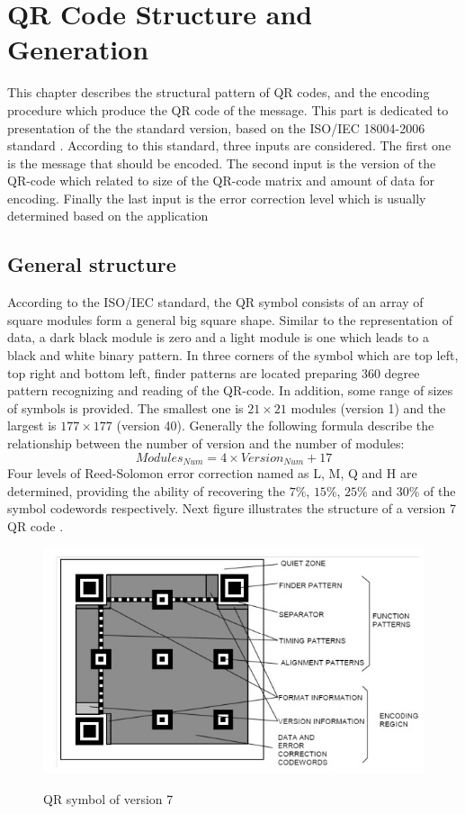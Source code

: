 \chapter{QR Code Structure and Generation}

This chapter describes the structural pattern of QR codes, and the encoding procedure which produce the QR code of the message. This part is dedicated to presentation of the the standard version, based on the ISO/IEC 18004-2006 standard \cite{1iso}. According to this standard, three inputs are considered. The first one is the message that should be encoded. The second input is the version of the QR-code which related to size of the QR-code matrix and amount of data for encoding. Finally the last input is the error correction level which is usually determined based on the application 


\section{General structure}

According to the ISO/IEC standard, the QR symbol consists of an array of square modules form a general big square shape. Similar to the representation of data, a dark black module is zero and a light module is one which leads to a black and white binary pattern. In three corners of the symbol which are top left, top right and bottom left, finder patterns are located preparing 360 degree pattern recognizing and reading of the QR-code. In addition, some range of sizes of symbols is provided. The smallest one is $21 \times 21$ modules (version 1) and the largest is  $177 \times 177$ (version 40). Generally the following formula describe the relationship between the number of version and the number of modules:
$$Modules_{Num} = 4 \times Version_{Num} + 17$$
 Four levels of Reed-Solomon error correction named as L,
M, Q and H are determined, providing the ability of recovering the $7\%$, $15\%$, $25\%$ and $30\%$ of the symbol codewords respectively. Next figure illustrates the structure
of a version 7 QR code \cite{1iso}.
\begin{figure}[h!]
  \caption{QR symbol of version 7 \cite{1iso}}
  \centering
    \includegraphics[width=1\textwidth]{figures/Figure21Version7QR.jpg}
    \label{fig:21}
\end{figure}

